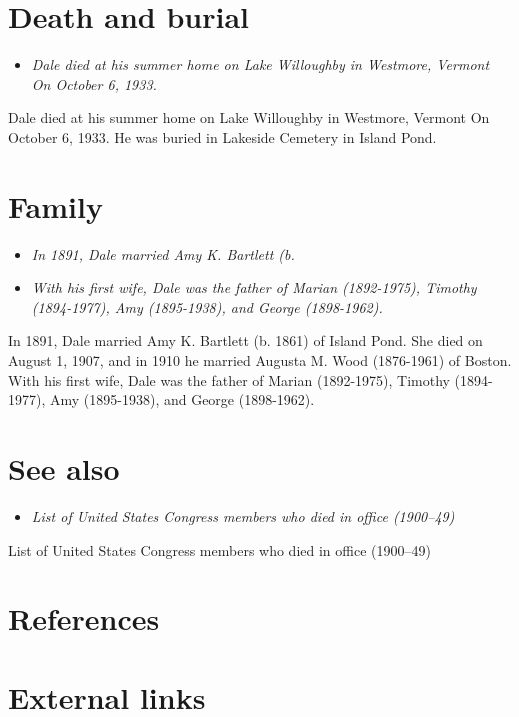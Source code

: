 \section{Death and burial}\label{death-and-burial}

\begin{itemize}
\item
  \emph{Dale died at his summer home on Lake Willoughby in Westmore,
  Vermont On October 6, 1933.}
\end{itemize}

Dale died at his summer home on Lake Willoughby in Westmore, Vermont On
October 6, 1933. He was buried in Lakeside Cemetery in Island Pond.

\section{Family}\label{family}

\begin{itemize}
\item
  \emph{In 1891, Dale married Amy K. Bartlett (b.}
\item
  \emph{With his first wife, Dale was the father of Marian (1892-1975),
  Timothy (1894-1977), Amy (1895-1938), and George (1898-1962).}
\end{itemize}

In 1891, Dale married Amy K. Bartlett (b. 1861) of Island Pond. She died
on August 1, 1907, and in 1910 he married Augusta M. Wood (1876-1961) of
Boston. With his first wife, Dale was the father of Marian (1892-1975),
Timothy (1894-1977), Amy (1895-1938), and George (1898-1962).

\section{See also}\label{see-also}

\begin{itemize}
\item
  \emph{List of United States Congress members who died in office
  (1900--49)}
\end{itemize}

List of United States Congress members who died in office (1900--49)

\section{References}\label{references}

\section{External links}\label{external-links}

